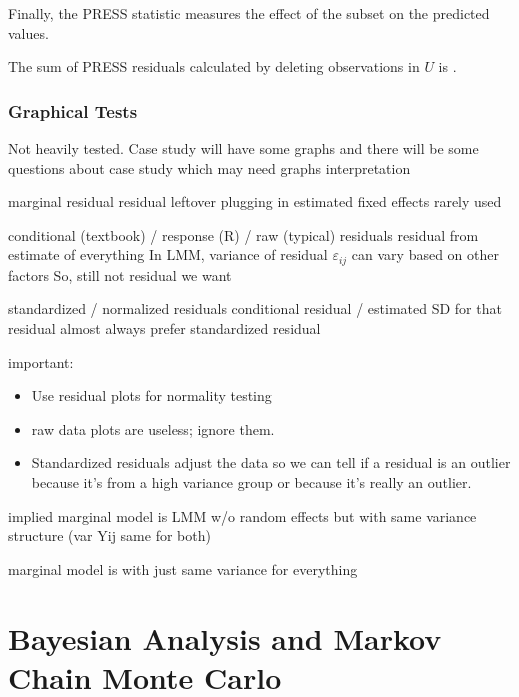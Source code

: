 \documentclass[english]{article}
\begin{document}
\begin{multicols*}{2}
\bigskip

Finally, the PRESS statistic measures the effect of the subset on the predicted values.
\begin{definitionNOHFILLsub}
The sum of PRESS residuals calculated by deleting observations in $U$ is .
\end{definitionNOHFILLsub}


\section{Graphical Tests}
Not heavily tested.
	Case study will have some graphs and there will be some questions about case study which may need graphs interpretation
	
marginal residual
	residual leftover plugging in estimated fixed effects
	rarely used
	
conditional (textbook) / response (R) / raw (typical) residuals
	residual from estimate of everything
	In LMM, variance of residual $\varepsilon_{ij}$ can vary based on other factors
	So, still not residual we want

	
standardized / normalized residuals
	conditional residual / estimated SD for that residual
	almost always prefer standardized residual
	
important:
\begin{itemize}
	\item	Use residual plots for normality testing
	\item	raw data plots are useless; ignore them.
	\item	Standardized residuals adjust the data so we can tell if a residual is an outlier because it's from a high variance group or because it's really an outlier.
\end{itemize}


implied marginal model is LMM w/o random effects but with same variance structure (var Yij same for both)

marginal model is with just same variance for everything 

\newpage
\part{Bayesian Analysis and Markov Chain Monte Carlo}\label{part:BAandMCMC}




\end{multicols*}
\end{document}
